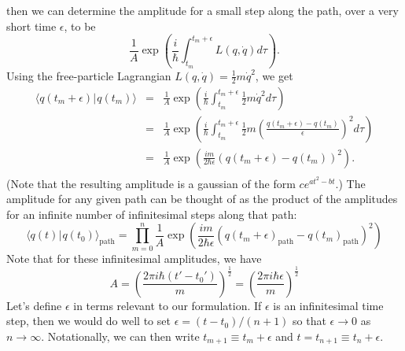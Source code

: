 \documentclass{amsart}
\newcommand{\md}{d}		%
\newcommand{\ket}[1]{\vert \hspace{1pt}#1\rangle}
\newcommand{\braket}[2]{\langle #1 \ket{#2}}
\newcommand{\qv}{q}
\begin{document}
then we can determine the amplitude for a small step along the path, over a very short time $\epsilon$, to be
\begin{equation*}
\frac{1}{A} \exp{\left(\frac{i}{\hbar}\int_{t_m}^{t_m + \epsilon} L(\qv,\dot{\qv}) \md \tau\right)}.
\end{equation*}
Using the free-particle Lagrangian $L(\qv,\dot{\qv}) = \frac{1}{2}m \dot{\qv}^2$, we get
\begin{eqnarray*}
\braket{\qv(t_m + \epsilon)}{\qv(t_m)} &=& \frac{1}{A} \exp{\left( \frac{i}{\hbar}\int_{t_m}^{t_m + \epsilon} \frac{1}{2} m \dot{\qv}^2 \md \tau \right)}\\
	&=& \frac{1}{A} \exp{\left( \frac{i}{\hbar}\int_{t_m}^{t_m + \epsilon} \frac{1}{2} m \left(\frac{\qv(t_m + \epsilon) - \qv(t_m)}{\epsilon}\right)^2  \md \tau \right)}\\
	&=& \frac{1}{A} \exp{\left( \frac{i m}{2 \hbar \epsilon} \left(\qv(t_m + \epsilon) - \qv(t_m)\right)^2 \right)}.\\
\end{eqnarray*}
(Note that the resulting amplitude is a gaussian of the form $ce^{at^2 - bt}$.)  The amplitude for any given path can be thought of as the product of the amplitudes for an infinite number of infinitesimal steps along that path:
\begin{equation*}
\braket{\qv(t)}{\qv(t_0)}_{\text{path}} = \prod_{m=0}^{n} \frac{1}{A} \exp{\left( \frac{i m}{2 \hbar \epsilon} \left(\qv(t_m + \epsilon)_{\text{path}} - \qv(t_m)_{\text{path}}\right)^2 \right)}
\end{equation*}
Note that for these infinitesimal amplitudes, we have
\begin{equation*}
A = \left( \frac{2 \pi i \hbar (t' - t_0')}{m} \right)^{\frac{1}{2}} = \left( \frac{2 \pi i \hbar \epsilon}{m} \right)^{\frac{1}{2}}
\end{equation*}
Let's define $\epsilon$ in terms relevant to our formulation.  If $\epsilon$ is an infinitesimal time step, then we would do well to set $\epsilon = (t-t_0)/(n+1)$ so that $\epsilon\rightarrow 0$ as $n\rightarrow \infty$.  Notationally, we can then write $t_{m+1} \equiv t_m + \epsilon$ and $t = t_{n+1} \equiv t_{n} + \epsilon $.
\end{document}
